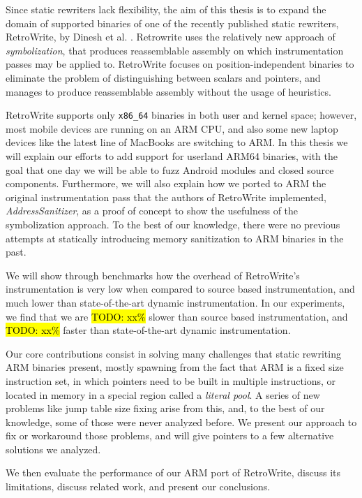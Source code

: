 \documentclass[a4paper,11pt,oneside]{report}
\newcommand{\sysname}{RetroWrite\xspace}
\newcommand{\todo}[1]{%
	\begingroup 
	\sethlcolor{cyan}%
	\hl{TODO: #1}%
	\endgroup
}
\begin{document}
Since static rewriters lack flexibility, the aim of this thesis is to expand 
the domain of supported binaries of one of the recently published static 
rewriters, \sysname, by Dinesh et al. \cite{dinesh20oakland}. Retrowrite uses 
the relatively new approach of \emph{symbolization}, that produces 
reassemblable assembly on which instrumentation passes may be applied to.  
\sysname focuses on position-independent binaries to eliminate the problem of 
distinguishing between scalars and pointers, and manages to produce 
reassemblable assembly without the usage of heuristics. 

\sysname supports only \texttt{x86\_64} binaries in both user and kernel 
space; however, most mobile devices are running on an ARM CPU, and also some 
new laptop devices like the latest line of MacBooks are switching to ARM. In 
this thesis we will explain our efforts to add support for userland ARM64 
binaries, with the goal that one day we will be able to fuzz Android modules 
and closed source components. Furthermore, we will also explain how we ported 
to ARM the original instrumentation pass that the authors of \sysname 
implemented, \emph{AddressSanitizer}, as a proof of concept to show the 
usefulness of the symbolization approach. To the best of our knowledge, there 
were no previous attempts at statically introducing memory sanitization to ARM 
binaries in the past. 

We will show through benchmarks how the overhead of \sysname's 
instrumentation is very low when compared to source based instrumentation, and 
much lower than state-of-the-art dynamic instrumentation. In our experiments, 
we find that we are \todo{xx\%} slower than source based instrumentation, and 
\todo{xx\%} faster than state-of-the-art dynamic instrumentation.

Our core contributions consist in solving many challenges that static rewriting 
ARM binaries present, mostly spawning from the fact that ARM is a fixed size 
instruction set, in which pointers need to be built in multiple instructions, 
or located in memory in a special region called a \emph{literal pool}. A series 
of new problems like jump table size fixing arise from this, and, to the best 
of our knowledge, some of those were never analyzed before.  We present our 
approach to fix or workaround those problems, and will give pointers to a few 
alternative solutions we analyzed.

We then evaluate the performance of our ARM port of \sysname , discuss its 
limitations, discuss related work, and present our conclusions.
\end{document}
